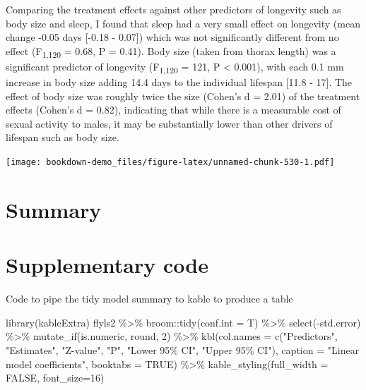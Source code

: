 \documentclass[
]{book}
\newenvironment{Shaded}{\begin{snugshade}}{\end{snugshade}}
\newcommand{\AttributeTok}[1]{\textcolor[rgb]{0.77,0.63,0.00}{#1}}
\newcommand{\ConstantTok}[1]{\textcolor[rgb]{0.00,0.00,0.00}{#1}}
\newcommand{\DecValTok}[1]{\textcolor[rgb]{0.00,0.00,0.81}{#1}}
\newcommand{\FunctionTok}[1]{\textcolor[rgb]{0.00,0.00,0.00}{#1}}
\newcommand{\NormalTok}[1]{#1}
\newcommand{\SpecialCharTok}[1]{\textcolor[rgb]{0.00,0.00,0.00}{#1}}
\newcommand{\StringTok}[1]{\textcolor[rgb]{0.31,0.60,0.02}{#1}}
\begin{document}
Comparing the treatment effects against other predictors of longevity such as body size and sleep, I found that sleep had a very small effect on longevity (mean change -0.05 days {[}-0.18 - 0.07{]}) which was not significantly different from no effect (F\textsubscript{1,120} = 0.68, P = 0.41). Body size (taken from thorax length) was a significant predictor of longevity (F\textsubscript{1,120} = 121, P \textless{} 0.001), with each 0.1 mm increase in body size adding 14.4 days to the individual lifespan {[}11.8 - 17{]}. The effect of body size was roughly twice the size (Cohen's d = 2.01) of the treatment effects (Cohen's d = 0.82), indicating that while there is a measurable cost of sexual activity to males, it may be substantially lower than other drivers of lifespan such as body size.

\texttt{[image: bookdown-demo\_files/figure-latex/unnamed-chunk-530-1.pdf]}

\hypertarget{summary-8}{%
\section{Summary}\label{summary-8}}

\hypertarget{supplementary-code}{%
\section{Supplementary code}\label{supplementary-code}}

Code to pipe the tidy model summary to kable to produce a table

\begin{Shaded}
\begin{Highlighting}[]
\FunctionTok{library}\NormalTok{(kableExtra)}
\NormalTok{flyls2 }\SpecialCharTok{\%\textgreater{}\%}\NormalTok{ broom}\SpecialCharTok{::}\FunctionTok{tidy}\NormalTok{(}\AttributeTok{conf.int =}\NormalTok{ T) }\SpecialCharTok{\%\textgreater{}\%} 
 \FunctionTok{select}\NormalTok{(}\SpecialCharTok{{-}}\StringTok{\textasciigrave{}}\AttributeTok{std.error}\StringTok{\textasciigrave{}}\NormalTok{) }\SpecialCharTok{\%\textgreater{}\%} 
\FunctionTok{mutate\_if}\NormalTok{(is.numeric, round, }\DecValTok{2}\NormalTok{) }\SpecialCharTok{\%\textgreater{}\%} 
\FunctionTok{kbl}\NormalTok{(}\AttributeTok{col.names =} \FunctionTok{c}\NormalTok{(}\StringTok{"Predictors"}\NormalTok{,}
                    \StringTok{"Estimates"}\NormalTok{,}
                    \StringTok{"Z{-}value"}\NormalTok{,}
                    \StringTok{"P"}\NormalTok{,}
                    \StringTok{"Lower 95\% CI"}\NormalTok{,}
                    \StringTok{"Upper 95\% CI"}\NormalTok{),}
      \AttributeTok{caption =} \StringTok{"Linear model coefficients"}\NormalTok{, }
    \AttributeTok{booktabs =} \ConstantTok{TRUE}\NormalTok{) }\SpecialCharTok{\%\textgreater{}\%} 
   \FunctionTok{kable\_styling}\NormalTok{(}\AttributeTok{full\_width =} \ConstantTok{FALSE}\NormalTok{, }\AttributeTok{font\_size=}\DecValTok{16}\NormalTok{)}
\end{Highlighting}
\end{Shaded}
\end{document}
